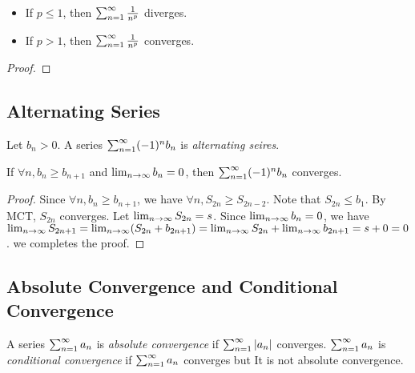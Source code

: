 \begin{theorem}
  \begin{itemize}
    \item If $p \le 1$, then $\sum_{n=1}^{\infty} \frac{1}{n^p}$ diverges.
    \item If $p > 1$, then $\sum_{n=1}^{\infty} \frac{1}{n^p}$ converges.
  \end{itemize}
  \label{thm:ser_test_p}
\end{theorem}
\begin{proof}

\end{proof}



\subsection{Alternating Series}

\begin{definition}
  Let $b_n > 0$. A series $\sum_{n=1}^{\infty} (-1)^nb_n$ is \emph{alternating seires}.
  \label{def:ser_alt}
\end{definition}

\begin{theorem}
  If $\forall n, b_n \ge b_{n+1}$ and $\lim_{n \to \infty} b_n = 0$, then $\sum_{n=1}^{\infty} (-1)^n b_n$
  converges.
  \label{thm:ser_alt_conv}
\end{theorem}
\begin{proof}
  Since $\forall n, b_n \ge b_{n+1}$, we have $\forall n, S_{2n} \ge S_{2n-2}$.
  Note that $S_{2n} \le b_1$. By MCT, $S_{2n}$ converges. Let $\lim_{n \to \infty} S_{2n} =
    s$. Since $\lim_{n \to \infty} b_n = 0$, we have $\lim_{n \to \infty} S_{2n + 1} = \lim_{n \to \infty} (S_{2n} +
    b_{2n+1}) = \lim_{n \to \infty} S_{2n} + \lim_{n \to \infty} b_{2n+1} = s + 0 = 0$. we completes the proof.
\end{proof}



\subsection{Absolute Convergence and Conditional Convergence}

\begin{definition}
  A series $\sum_{n=1}^{\infty} a_n$ is \emph{absolute convergence}
  if $\sum_{n=1}^{\infty} \left| a_n \right|$ converges. $\sum_{n=1}^{\infty} a_n$ is \emph{conditional convergence} if
  $\sum_{n=1}^{\infty} a_n$ converges but It is not absolute convergence.
  \label{def:ser_abs}
\end{definition}

